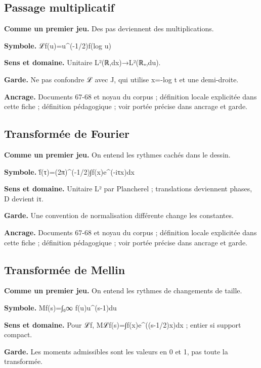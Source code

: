 \documentclass[
  9pt,
  a4paper,
]{article}
\begin{document}
\hypertarget{passage-multiplicatif}{%
\subsection{Passage multiplicatif}\label{passage-multiplicatif}}

\textbf{Comme un premier jeu.} Des pas deviennent des multiplications.

\textbf{Symbole.} ℒf(u)=u\^{}(-1/2)f(log u)

\textbf{Sens et domaine.} Unitaire L²(ℝ,dx)→L²(ℝ₊,du).

\textbf{Garde.} Ne pas confondre ℒ avec J, qui utilise x=-log t et une
demi-droite.

\textbf{Ancrage.} Documents 67-68 et noyau du corpus ; définition locale
explicitée dans cette fiche ; définition pédagogique ; voir portée
précise dans ancrage et garde.

\hypertarget{transformuxe9e-de-fourier}{%
\subsection{Transformée de Fourier}\label{transformuxe9e-de-fourier}}

\textbf{Comme un premier jeu.} On entend les rythmes cachés dans le
dessin.

\textbf{Symbole.} f̂(τ)=(2π)\^{}(-1/2)∫f(x)e\^{}(-iτx)dx

\textbf{Sens et domaine.} Unitaire L² par Plancherel ; translations
deviennent phases, D devient iτ.

\textbf{Garde.} Une convention de normalisation différente change les
constantes.

\textbf{Ancrage.} Documents 67-68 et noyau du corpus ; définition locale
explicitée dans cette fiche ; définition pédagogique ; voir portée
précise dans ancrage et garde.

\hypertarget{transformuxe9e-de-mellin}{%
\subsection{Transformée de Mellin}\label{transformuxe9e-de-mellin}}

\textbf{Comme un premier jeu.} On entend les rythmes de changements de
taille.

\textbf{Symbole.} Mf(s)=∫₀∞ f(u)u\^{}(s-1)du

\textbf{Sens et domaine.} Pour ℒf, Mℒf(s)=∫f(x)e\^{}((s-1/2)x)dx ;
entier si support compact.

\textbf{Garde.} Les moments admissibles sont les valeurs en 0 et 1, pas
toute la transformée.
\end{document}

